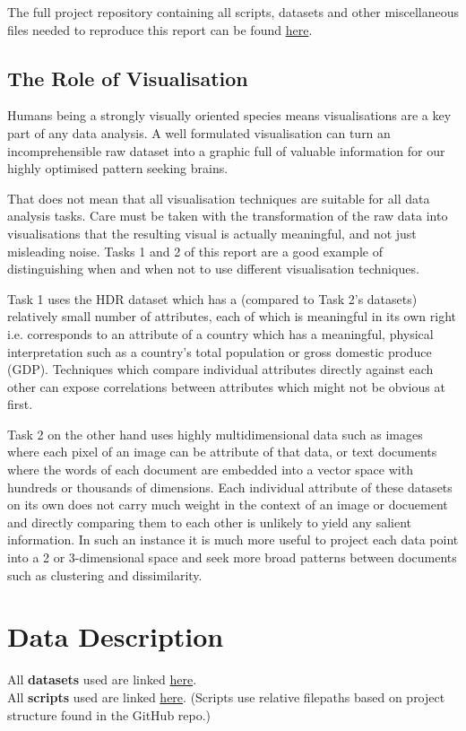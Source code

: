 \documentclass[11pt,a4paper,final]{article}
\begin{document}
The full project repository containing all scripts, datasets and other miscellaneous files needed to reproduce this report can be found \href{https://github.com/jackoc1/CS3205HumanDevelopmentReports}{here}.

\subsection{The Role of Visualisation}
Humans being a strongly visually oriented species means visualisations are a key part of any data analysis. A well formulated visualisation can turn an incomprehensible raw dataset into a graphic full of valuable information for our highly optimised pattern seeking brains.

That does not mean that all visualisation techniques are suitable for all data analysis tasks. Care must be taken with the transformation of the raw data into visualisations that the resulting visual is actually meaningful, and not just misleading noise. Tasks 1 and 2 of this report are a good example of distinguishing when and when not to use different visualisation techniques.

Task 1 uses the HDR dataset which has a (compared to Task 2's datasets) relatively small number of attributes, each of which is meaningful in its own right i.e. corresponds to an attribute of a country which has a meaningful, physical interpretation such as a country's total population or gross domestic produce (GDP). Techniques which compare individual attributes directly against each other can expose correlations between attributes which might not be obvious at first.

Task 2 on the other hand uses highly multidimensional data such as images where each pixel of an image can be attribute of that data, or text documents where the words of each document are embedded into a vector space with hundreds or thousands of dimensions. Each individual attribute of these datasets on its own does not carry much weight in the context of an image or docuement and directly comparing them to each other is unlikely to yield any salient information. In such an instance it is much more useful to project each data point into a 2 or 3-dimensional space and seek more broad patterns between documents such as clustering and dissimilarity.

\pagebreak
\section{Data Description}
All \textbf{datasets} used are linked \href{https://github.com/jackoc1/CS3205HumanDevelopmentReports/tree/master/data}{here}.
\\
All \textbf{scripts} used are linked \href{https://github.com/jackoc1/CS3205HumanDevelopmentReports/tree/master/scripts}{here}. (Scripts use relative filepaths based on project structure found in the GitHub repo.)
\end{document}
